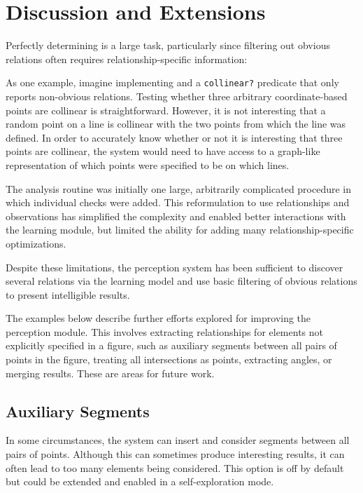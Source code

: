 \section{Discussion and Extensions}

Perfectly determining is a large task, particularly since filtering
out obvious relations often requires relationship-specific information:

As one example, imagine implementing and a \texttt{collinear?}
predicate that only reports non-obvious relations. Testing whether
three arbitrary coordinate-based points are collinear is
straightforward. However, it is not interesting that a random point on
a line is collinear with the two points from which the line was
defined. In order to accurately know whether or not it is interesting
that three points are collinear, the system would need to have access
to a graph-like representation of which points were specified to be on
which lines.

The analysis routine was initially one large, arbitrarily complicated
procedure in which individual checks were added. This reformulation to
use relationships and observations has simplified the complexity and
enabled better interactions with the learning module, but limited the
ability for adding many relationship-specific optimizations.

Despite these limitations, the perception system has been sufficient
to discover several relations via the learning model and use basic
filtering of obvious relations to present intelligible results.

The examples below describe further efforts explored for improving the
perception module. This involves extracting relationships for elements
not explicitly specified in a figure, such as auxiliary segments
between all pairs of points in the figure, treating all intersections
as points, extracting angles, or merging results. These are areas for
future work.

\subsection{Auxiliary Segments}

In some circumstances, the system can insert and consider segments
between all pairs of points. Although this can sometimes produce
interesting results, it can often lead to too many elements being
considered. This option is off by default but could be extended and
enabled in a self-exploration mode.

